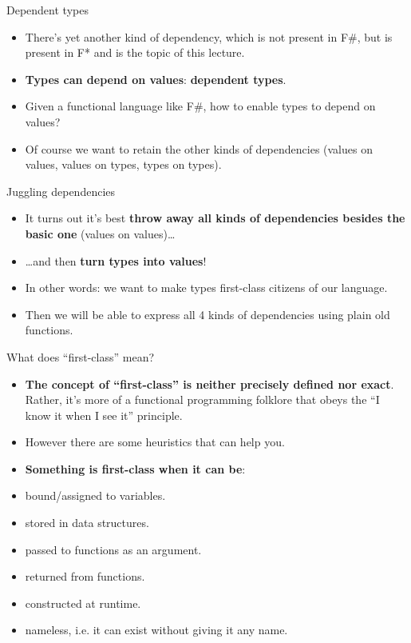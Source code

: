\documentclass{beamer}
\begin{document}
\begin{frame}{Dependent types}
\begin{itemize}
	\item There's yet another kind of dependency, which is not present in F\#, but is present in F* and is the topic of this lecture.
	\item \textbf{Types can depend on values}: \textbf{dependent types}.
	\item Given a functional language like F\#, how to enable types to depend on values?
	\item Of course we want to retain the other kinds of dependencies (values on values, values on types, types on types).
\end{itemize}
\end{frame}

\begin{frame}{Juggling dependencies}
\begin{itemize}
	\item It turns out it's best \textbf{throw away all kinds of dependencies besides the basic one} (values on values)\dots
	\item \dots and then \textbf{turn types into values}!
	\item In other words: we want to make types first-class citizens of our language.
	\item Then we will be able to express all 4 kinds of dependencies using plain old functions.
\end{itemize}
\end{frame}

\begin{frame}{What does ``first-class'' mean?}
\begin{itemize}
	\item \textbf{The concept of ``first-class'' is neither precisely defined nor exact}. Rather, it's more of a functional programming folklore that obeys the ``I know it when I see it'' principle.
	\item However there are some heuristics that can help you.
	\item \textbf{Something is first-class when it can be}:
	\item bound/assigned to variables.
	\item stored in data structures.
	\item passed to functions as an argument.
	\item returned from functions.
	\item constructed at runtime.
	\item nameless, i.e. it can exist without giving it any name.
\end{itemize}
\end{frame}
\end{document}
